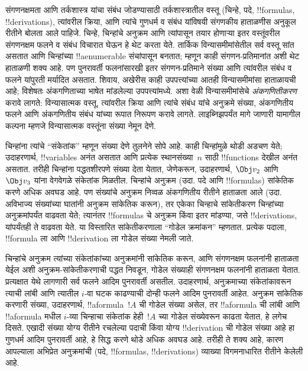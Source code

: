 \documentclass[../../../include/open-logic-section]{subfiles}
\begin{document}

संगणनक्षमता आणि तर्कशास्त्र यांचा संबंध जोडण्यासाठी तर्कशास्त्रातील
वस्तू (चिन्हे, पदे, !!{formula}s, !!{derivation}s), त्यांवरील क्रिया,
आणि त्यांचे गुणधर्म व संबंध यांविषयी संगणकीय हाताळणीस अनुकूल रीतीने
बोलता आले पाहिजे. चिन्हे, चिन्हांचे अनुक्रम आणि त्यांपासून तयार
होणाऱ्या इतर वस्तूंवरील संगणनक्षम फलने व संबंध विचारात घेऊन हे थेट
करता येते. तार्किक विन्यासमीमांसेतील सर्व वस्तू सांत असतात आणि
चिन्हांच्या !!a{enumerable} संचांपासून बनतात; म्हणून काही संगणन-प्रतिमानांत
अशी थेट हाताळणी शक्य आहे. पण पुनरावर्ती फलनांसारखी इतर संगणन-प्रतिमाने
संख्या आणि त्यांवरील संबंध व फलने यांपुरती मर्यादित असतात. शिवाय,
अखेरीस काही उपपत्त्यांच्या आतही विन्यासमीमांसा हाताळायची आहे;
विशेषतः अंकगणिताच्या भाषेत मांडलेल्या उपपत्त्यांमध्ये. अशा वेळी
विन्यासमीमांसेचे \emph{अंकगणितीकरण} करावे लागते: विन्यासात्मक वस्तू,
त्यांवरील क्रिया आणि त्यांचे संबंध यांचे अनुक्रमे संख्या, अंकगणितीय
फलने आणि अंकगणितीय संबंध यांच्या रूपात निरूपण करावे लागते. लाइब्निझपर्यंत
मागे जाणारी यामागील कल्पना म्हणजे विन्यासात्मक वस्तूंना संख्या नेमून देणे.

चिन्हांना त्यांचे ``संकेतांक'' म्हणून संख्या देणे तुलनेने सोपे आहे.
काही चिन्हांमुळे थोडी अडचण येते; उदाहरणार्थ, !!{variable}s अनंत असतात
आणि प्रत्येक स्थानसंख्या~$n$ साठी !!{function}s देखील अनंत असतात.
तरीही चिन्हांना पद्धतशीरपणे संख्या देता येतात, जेणेकरून, उदाहरणार्थ,
$\Obj v_2$ आणि $\Obj v_3$ यांना वेगवेगळे संकेतांक मिळतील. चिन्हांचे
अनुक्रम (उदा. पदे आणि !!{formula}s) सांकेतिक करणे अधिक अवघड आहे.
पण संख्यांचे अनुक्रम निव्वळ अंकगणितीय रीतीने हाताळता आले (उदा.
अविभाज्य संख्यांच्या घातांनी अनुक्रम सांकेतिक करून), तर एकेका चिन्हाचे
सांकेतीकरण चिन्हांच्या अनुक्रमांपर्यंत वाढवता येते; त्यानंतर
!!{formula}s चे अनुक्रम किंवा इतर मांडण्या, जसे !!{derivation}s,
यांपर्यंतही ते वाढवता येते. या विस्तारित सांकेतीकरणाला ``गोडेल
क्रमांकन'' म्हणतात. प्रत्येक पदाला, !!{formula} ला आणि
!!{derivation} ला गोडेल संख्या नेमली जाते.

चिन्हांचे अनुक्रम त्यांच्या संकेतांकांच्या अनुक्रमांनी सांकेतिक करून,
आणि संगणनक्षम फलनांनी हाताळता येईल अशी अनुक्रम-सांकेतीकरणाची पद्धत
निवडून, गोडेल संख्याही संगणनक्षम फलनांनी हाताळता येतात. प्रत्यक्षात
येथे लागणारी सर्व फलने आदिम पुनरावर्ती असतील. उदाहरणार्थ, अनुक्रमाच्या
संकेतांकावरून त्याची लांबी आणि त्यातील $i$-वा घटक काढण्याची दोन्ही
फलने आदिम पुनरावर्ती आहेत. अनुक्रम सांकेतिक करणारी संख्या, उदाहरणार्थ,
!!a{formula}~$!A$ ची गोडेल संख्या असेल, तर !!a{formula} ची लांबी
आणि !!a{formula} मधील $i$-व्या चिन्हाचा संकेतांक हेही~$!A$ च्या
गोडेल संख्येवरून काढता येतात, हे लगेच दिसते. एखादी संख्या योग्य
रीतीने रचलेल्या पदाची किंवा योग्य !!{derivation} ची गोडेल संख्या
आहे हा गुणधर्म आदिम पुनरावर्ती आहे, हे सिद्ध करणे थोडे अधिक अवघड आहे.
तरीही ते शक्य आहे, कारण आपल्याला अभिप्रेत अनुक्रमांची (पदे,
!!{formula}s, !!{derivation}s) व्याख्या विगमनाधारित रीतीने केलेली आहे.
\end{document}
